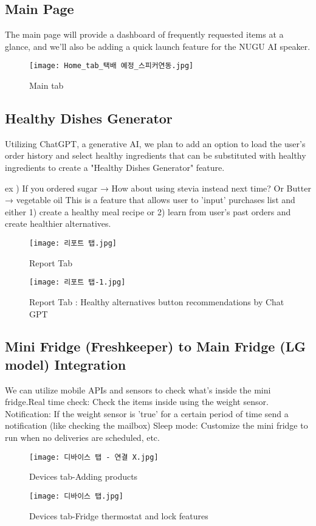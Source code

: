 \documentclass[conference]{IEEEtran}
\begin{document}
\subsection{Main Page}
The main page will provide a dashboard of frequently requested items at a glance, and we'll also be adding a quick launch feature for the NUGU AI speaker.

    \begin{figure}[h]
    \centerline{
        \texttt{[image: Home\_tab\_택배 예정\_스피커연동.jpg]}
    }
    \label{fig}
    \caption{Main tab}
    \end{figure}

\subsection{Healthy Dishes Generator}
Utilizing ChatGPT, a generative AI, we plan to add an option to load the user's order history and select healthy ingredients that can be substituted with healthy ingredients to create a "Healthy Dishes Generator" feature. \par
 ex ) If you ordered sugar → How about using stevia instead next time? Or Butter → vegetable oil 
This is a feature that allows user to 'input' purchases list and either 1) create a healthy meal recipe or 2) learn from user's past orders and create healthier alternatives. 
    \begin{figure}[h]
    \centerline{\texttt{[image: 리포트 탭.jpg]}}
    \caption{Report Tab}
    \label{fig}
    \end{figure}

    \begin{figure}[h]
        \centerline{\texttt{[image: 리포트 탭-1.jpg]}}
    \label{fig}
    \caption{Report Tab : Healthy alternatives button recommendations by Chat GPT}
    \end{figure}

\subsection{Mini Fridge (Freshkeeper) to Main Fridge (LG model) Integration}
We can utilize mobile APIs and sensors to check what's inside the mini fridge.Real time check: Check the items inside using the weight sensor.
Notification: If the weight sensor is 'true' for a certain period of time send a notification (like checking the mailbox)
Sleep mode: Customize the mini fridge to run when no deliveries are scheduled, etc.
    \begin{figure}[h]
        \centerline{\texttt{[image: 디바이스 탭 - 연결 X.jpg]}}
    \label{fig}
    \caption{Devices tab-Adding products}
    \end{figure}
  \begin{figure}[h]
        \centerline{\texttt{[image: 디바이스 탭.jpg]}}
    \label{fig}
    \caption{Devices tab-Fridge thermostat and lock features}
    \end{figure}
    
\end{document}

